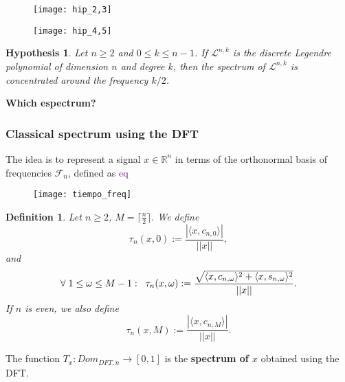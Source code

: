 \documentclass[]{beamer}
\newtheorem{defi}{\bf Definition}
\newtheorem{hip}{\bf Hypothesis}
\theoremstyle{definition}
\newcommand{\TODO}[1]{\textcolor{purple}{#1}}
\newcommand{\IR}{\mathbb{R}}
\newcommand{\cali}[1]{\mathcal{#1}} %
\begin{document}
\begin{frame}
\begin{figure}[h]
\texttt{[image: hip\_2,3]}
\end{figure}
\end{frame}


\begin{frame}
\begin{figure}[h]
\texttt{[image: hip\_4,5]}
\end{figure}
\end{frame}

\begin{frame}
\begin{hip}
Let $n \geq 2$ and $0 \leq k \leq n-1$. If
$\cali{L}^{n,k}$ is the discrete Legendre polynomial of 
dimension $n$ and degree $k$, then the spectrum
of $\cali{L}^{n,k}$ is concentrated around the frequency
$k/2$.
\end{hip}

\begin{center}
\textbf{Which espectrum?}
\end{center}
\end{frame}




\begin{frame}
\frametitle{Classical spectrum using the DFT}
The idea is to represent a signal $x \in \IR^{n}$ in terms
of the orthonormal basis of frequencies 
$\cali{F}_{n}$, defined as
\TODO{eq}

\begin{figure}[h]
\texttt{[image: tiempo\_freq]}
\end{figure}
\end{frame}


\begin{frame}
\begin{defi}
\label{def: taus}
Let $n \geq 2$, $M = \lceil \frac{n}{2} \rceil $.
We define
	\[
	\tau_{n}(x, 0) := \frac{|\langle x, c_{n,0} \rangle|}{|| x ||} ,	
	\]
	and
	\[
	\forall 
	\hspace{0.1cm}	
	1 \leq \omega \leq M-1: \hspace{0.2cm} 
	\tau_{n}(x, \omega) := 
	\frac{\sqrt{
	\langle x, c_{n,\omega} \rangle^{2}+
	\langle x, s_{n,\omega} \rangle^{2}}}{||x||}.	
	\]	
	If $n$ is even, we also define
	\[
	\tau_{n}(x, M) := 
	\frac{ |\langle x, c_{n,M} \rangle| }{ ||x|| }.
	\]
\end{defi}
The function $T_{x}: Dom_{DFT, n} \longrightarrow [0,1]$
is the \textbf{spectrum of $x$} obtained using the DFT.
\end{frame}
\end{document}
